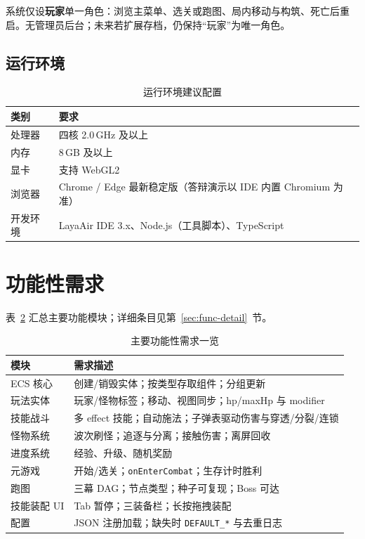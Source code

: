 系统仅设\textbf{玩家}单一角色：浏览主菜单、选关或跑图、局内移动与构筑、死亡后重启。无管理员后台；未来若扩展存档，仍保持“玩家”为唯一角色。

\subsection{运行环境}

\begin{table}[htbp]
  \centering
  \caption{运行环境建议配置}
  \label{tab:run-env}
  \begin{tabular}{ll}
    \toprule
    \textbf{类别} & \textbf{要求} \\
    \midrule
    处理器 & 四核 2.0\,GHz 及以上 \\
    内存 & 8\,GB 及以上 \\
    显卡 & 支持 WebGL2 \\
    浏览器 & Chrome / Edge 最新稳定版（答辩演示以 IDE 内置 Chromium 为准） \\
    开发环境 & LayaAir IDE 3.x、Node.js（工具脚本）、TypeScript \\
    \bottomrule
  \end{tabular}
\end{table}

\section{功能性需求}

表~\ref{tab:func-req} 汇总主要功能模块；详细条目见第~\ref{sec:func-detail}~节。

\begin{table}[htbp]
  \centering
  \caption{主要功能性需求一览}
  \label{tab:func-req}
  \begin{tabular}{p{3.0cm}p{9.7cm}}
    \toprule
    \textbf{模块} & \textbf{需求描述} \\
    \midrule
    ECS 核心 & 创建/销毁实体；按类型存取组件；分组更新 \\
    玩法实体 & 玩家/怪物标签；移动、视图同步；hp/maxHp 与 modifier \\
    技能战斗 & 多 effect 技能；自动施法；子弹表驱动伤害与穿透/分裂/连锁 \\
    怪物系统 & 波次刷怪；追逐与分离；接触伤害；离屏回收 \\
    进度系统 & 经验、升级、随机奖励 \\
    元游戏 & 开始/选关；\texttt{onEnterCombat}；生存计时胜利 \\
    跑图 & 三幕 DAG；节点类型；种子可复现；Boss 可达 \\
    技能装配 UI & Tab 暂停；三装备栏；长按拖拽装配 \\
    配置 & JSON 注册加载；缺失时 \texttt{DEFAULT\_*} 与去重日志 \\
    \bottomrule
  \end{tabular}
\end{table}

